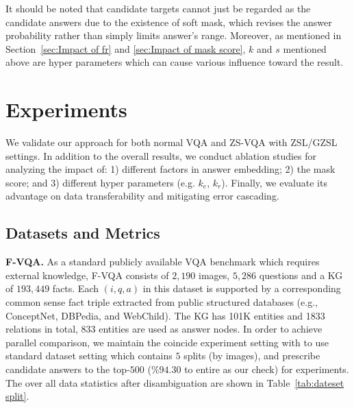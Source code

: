 \documentclass[runningheads]{llncs}
\newcommand{\cjy}[1]{{\color{black}#1}}
\begin{document}
It should be noted that candidate targets cannot just be regarded as the candidate answers due to the existence of soft mask, which revises the answer probability rather than simply limits answer's range. 
Moreover, as mentioned in Section~\ref{sec:Impact of fr} and \ref{sec:Impact of mask score}, $k$ and $s$ mentioned above are hyper parameters which can cause various influence toward the result.
\section{Experiments}
We validate our approach
for both normal VQA and ZS-VQA with \cjy{ZSL/GZSL settings. 
In addition to the overall results, we conduct ablation studies for analyzing the impact of: 1) different factors in answer embedding; 2) the mask score; and 3) different \cjy{hyper parameters} (e.g. $k_{e}$, $k_{r}$).}
Finally, we evaluate its advantage on data transferability and mitigating error cascading. 
\subsection{Datasets and Metrics}
\textbf{F-VQA.}
As a standard publicly available VQA benchmark which requires external knowledge, F-VQA \cite{DBLP:journals/pami/WangWSDH18} consists of $2,190$ images, $5,286$ questions and a KG of $193,449$ facts. Each $(i,q,a)$ in this dataset is supported by a corresponding common sense fact triple extracted from public structured databases (e.g., ConceptNet, DBPedia, and WebChild). The KG has 101K entities and 1833 relations in total, 833 entities are used as answer nodes. 
In order to achieve parallel comparison, we maintain the coincide experiment setting with \cite{DBLP:journals/pami/WangWSDH18,DBLP:conf/eccv/NarasimhanS18} to use standard dataset setting which contains $5$ splits (by images), and prescribe candidate answers to the top-$500$ (\%$94.30$ to entire as our check) for experiments. 
The over all data statistics after disambiguation are shown in Table~\ref{tab:dateset split}.  
\end{document}
